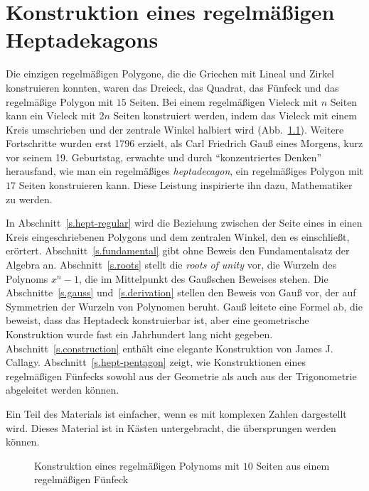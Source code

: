 

\chapter{Konstruktion eines regelmäßigen Heptadekagons}\label{c.heptadecagon}


Die einzigen regelmäßigen Polygone, die die Griechen mit Lineal und Zirkel konstruieren konnten, waren das Dreieck, das Quadrat, das Fünfeck und das regelmäßige Polygon mit $15$ Seiten. Bei einem regelmäßigen Vieleck mit $n$ Seiten kann ein Vieleck mit $2n$ Seiten konstruiert werden, indem das Vieleck mit einem Kreis umschrieben und der zentrale Winkel halbiert wird (Abb.~\ref{f.hept-double}). Weitere Fortschritte wurden erst 1796 erzielt, als Carl Friedrich Gauß eines Morgens, kurz vor seinem 19. Geburtstag, erwachte und durch ``konzentriertes Denken'' herausfand, wie man ein regelmäßiges \emph{heptadecagon}, ein regelmäßiges Polygon mit $17$ Seiten konstruieren kann. Diese Leistung inspirierte ihn dazu, Mathematiker zu werden.

In Abschnitt~\ref{s.hept-regular} wird die Beziehung zwischen der Seite eines in einen Kreis eingeschriebenen Polygons und dem zentralen Winkel, den es einschließt, erörtert. Abschnitt~\ref{s.fundamental} gibt ohne Beweis den Fundamentalsatz der Algebra an. Abschnitt~\ref{s.roots} stellt die \emph{roots of unity} vor, die Wurzeln des Polynoms $x^n-1$, die im Mittelpunkt des Gaußschen Beweises stehen. Die Abschnitte~\ref{s.gauss} und~\ref{s.derivation} stellen den Beweis von Gauß vor, der auf Symmetrien der Wurzeln von Polynomen beruht. Gauß leitete eine Formel ab, die beweist, dass das Heptadeck konstruierbar ist, aber eine geometrische Konstruktion wurde fast ein Jahrhundert lang nicht gegeben. Abschnitt~\ref{s.construction} enthält eine elegante Konstruktion von James J. Callagy. Abschnitt~\ref{s.hept-pentagon} zeigt, wie Konstruktionen eines regelmäßigen Fünfecks sowohl aus der Geometrie als auch aus der Trigonometrie abgeleitet werden können.

Ein Teil des Materials ist einfacher, wenn es mit komplexen Zahlen dargestellt wird. Dieses Material ist in Kästen untergebracht, die übersprungen werden können.
\begin{figure}[t]
\begin{center}
\end{center}
\caption{Konstruktion eines regelmäßigen Polynoms mit $10$ Seiten aus einem regelmäßigen Fünfeck}\label{f.hept-double}
\end{figure}

